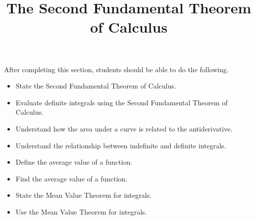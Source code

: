 \documentclass{ximera}
\title{The Second Fundamental Theorem of Calculus}
\begin{document}
\begin{abstract}
\end{abstract}

\maketitle

\begin{sectionOutcomes}

After completing this section, students should be able to do the following.

\begin{itemize}
	\item State the Second Fundamental Theorem of Calculus.
	\item Evaluate definite integrals using the Second Fundamental Theorem of Calculus.
	\item Understand how the area under a curve is related to the antiderivative.
	\item Understand the relationship between indefinite and definite integrals.
	\item Define the average value of a function.
	\item Find the average value of a function.
	\item State the Mean Value Theorem for integrals.
	\item Use the Mean Value Theorem for integrals.
\end{itemize}

\end{sectionOutcomes}
\end{document}

